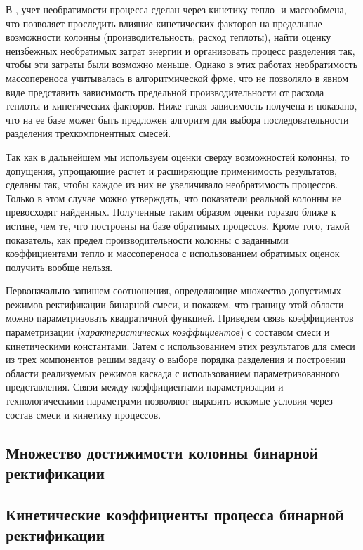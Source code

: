 \documentclass{article}
\begin{document}
     В \cite{Berry}, \cite{TsGrig} учет необратимости процесса сделан через кинетику тепло- и массообмена, что позволяет проследить влияние кинетических факторов на предельные возможности колонны (производительность, расход теплоты), найти оценку неизбежных необратимых затрат энергии и  организовать процесс разделения так, чтобы эти затраты были возможно меньше. Однако в этих работах необратимость массопереноса учитывалась в алгоритмической фрме, что не позволяло в явном виде представить  зависимость предельной производительности от расхода теплоты и кинетических факторов.   
Ниже такая зависимость получена и показано, что на ее базе может быть предложен алгоритм для выбора последовательности разделения трехкомпонентных смесей.
     
      Так как в дальнейшем мы используем оценки сверху возможностей колонны, то допущения, упрощающие расчет и расширяющие применимость результатов, сделаны так, чтобы каждое из них не увеличивало необратимость процессов. Только в этом случае можно утверждать, что показатели реальной колонны не превосходят  найденных. Полученные таким образом оценки гораздо ближе к истине, чем те, что построены на базе обратимых процессов. Кроме того, такой показатель, как предел производительности колонны с заданными коэффициентами тепло и массопереноса с использованием обратимых оценок  получить вообще нельзя.    
  
Первоначально запишем соотношения, определяющие множество допустимых режимов  ректификации  бинарной смеси, и покажем, что границу этой области можно  параметризовать квадратичной функцией. Приведем связь коэффициентов параметризации (\textit{характеристических коэффициентов}) с составом смеси и кинетическими константами. Затем с использованием этих результатов для смеси из трех компонентов решим задачу о выборе порядка разделения и построении области реализуемых режимов каскада с использованием параметризованного представления. Связи между коэффициентами параметризации и технологическими параметрами позволяют выразить искомые условия через состав смеси и кинетику процессов.

	\subsection{Множество достижимости колонны бинарной ректификации}

	\subsection{Кинетические коэффициенты процесса бинарной ректификации}
\end{document}
